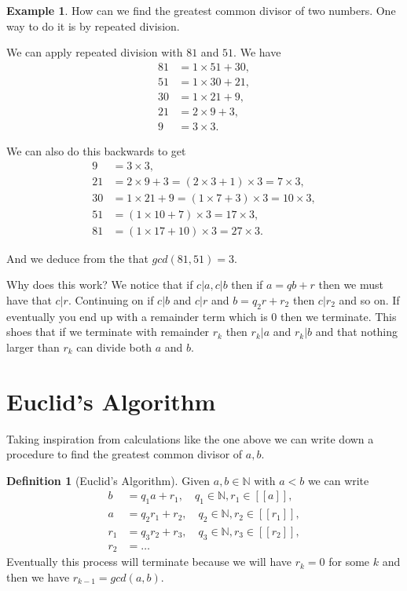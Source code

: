 \documentclass[
]{book}
\theoremstyle{definition}
\newtheorem{definition}{Definition}[chapter]
\theoremstyle{definition}
\newtheorem{example}{Example}[chapter]
\theoremstyle{definition}
\theoremstyle{definition}
\theoremstyle{remark}
\begin{document}
\begin{example}
How can we find the greatest common divisor of two numbers. One way to do it is by repeated division.

We can apply repeated division with \(81\) and \(51\). We have
\begin{align*}
81 & = 1 \times 51 + 30,\\
51 & = 1 \times 30 + 21,\\
30 & = 1 \times 21 + 9,\\
21 & = 2 \times 9 + 3,\\
9 & = 3 \times 3.
\end{align*}

We can also do this backwards to get
\begin{align*}
9 & = 3 \times 3,\\
21 & = 2 \times 9 + 3 = (2 \times 3 +1) \times 3 = 7 \times 3,\\
30 & = 1 \times 21 + 9 = (1 \times 7 + 3) \times 3 = 10 \times 3,\\
51 & = (1 \times  10 + 7) \times 3 = 17 \times 3,\\
81 & = (1 \times 17 + 10) \times 3 = 27 \times 3.
\end{align*}

And we deduce from the that \(gcd(81,51) = 3\).

Why does this work? We notice that if \(c|a, c|b\) then if \(a=qb+r\) then we must have that \(c|r\). Continuing on if \(c|b\) and \(c|r\) and \(b=q_2 r+ r_2\) then \(c|r_2\) and so on. If eventually you end up with a remainder term which is 0 then we terminate. This shoes that if we terminate with remainder \(r_k\) then \(r_k|a\) and \(r_k| b\) and that nothing larger than \(r_k\) can divide both \(a\) and \(b\).
\end{example}

\section{Euclid's Algorithm}\label{euclids-algorithm}

Taking inspiration from calculations like the one above we can write down a procedure to find the greatest common divisor of \(a,b\).

\begin{definition}[Euclid's Algorithm]
Given \(a, b \in \mathbb{N}\) with \(a < b\) we can write
\begin{align*}
b &= q_1a + r_1, \quad q_1 \in \mathbb{N}, r_1 \in [[a]],\\
a &= q_2r_1 + r_2, \quad q_2 \in \mathbb{N}, r_2 \in [[r_1]],\\
r_1 &= q_3r_2 + r_3, \quad q_3 \in \mathbb{N}, r_3 \in [[r_2]],\\
r_2 & = \dots
\end{align*}
Eventually this process will terminate because we will have \(r_k = 0\) for some \(k\) and then we have \(r_{k-1} = gcd(a,b)\).
\end{definition}
\end{document}
